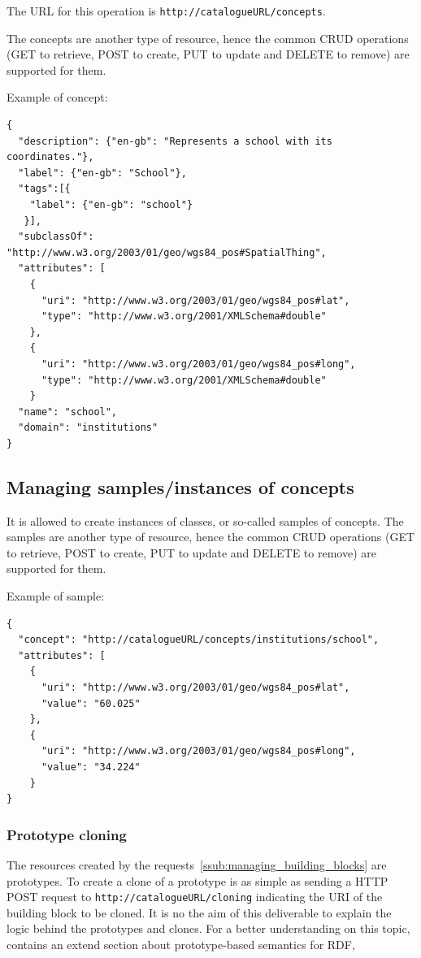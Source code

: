 \documentclass{fast_latex}
\begin{document}
The URL for this operation is \verb|http://catalogueURL/concepts|.

The concepts are another type of resource, hence the common CRUD operations (GET to retrieve, POST to create, PUT to update and DELETE to remove) are supported for them.

Example of concept:

\singlespacing
\begin{verbatim}
{          
  "description": {"en-gb": "Represents a school with its coordinates."}, 
  "label": {"en-gb": "School"},
  "tags":[{
    "label": {"en-gb": "school"}
   }],
  "subclassOf": "http://www.w3.org/2003/01/geo/wgs84_pos#SpatialThing",
  "attributes": [
    {
      "uri": "http://www.w3.org/2003/01/geo/wgs84_pos#lat",
      "type": "http://www.w3.org/2001/XMLSchema#double"
    },
    {
      "uri": "http://www.w3.org/2003/01/geo/wgs84_pos#long",
      "type": "http://www.w3.org/2001/XMLSchema#double"
    }
  "name": "school",
  "domain": "institutions"
}
\end{verbatim}
\doublespacing


\subsection{Managing samples/instances of concepts} %
\label{sub:managing_samples}

It is allowed to create instances of classes, or so-called samples of concepts. The samples are another type of resource, hence the common CRUD operations (GET to retrieve, POST to create, PUT to update and DELETE to remove) are supported for them.

Example of sample:

\singlespacing
\begin{verbatim}
{
  "concept": "http://catalogueURL/concepts/institutions/school",
  "attributes": [
    {
      "uri": "http://www.w3.org/2003/01/geo/wgs84_pos#lat",
      "value": "60.025"
    },
    {
      "uri": "http://www.w3.org/2003/01/geo/wgs84_pos#long",
      "value": "34.224"
    }
}
\end{verbatim}
\doublespacing


\subsubsection{Prototype cloning} %
\label{ssub:prototype_cloning}

The resources created by the requests~\ref{ssub:managing_building_blocks} are prototypes. To create a clone of a prototype is as simple as sending a HTTP POST request to \verb|http://catalogueURL/cloning| indicating the URI of the building block to be cloned. It is no the aim of this deliverable to explain the logic behind the prototypes and clones. For a better understanding on this topic,~\cite{moeller2011fast_ontology} contains an extend section about prototype-based semantics for RDF, 
\end{document}

